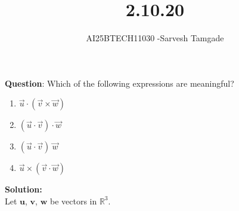 \documentclass[journal]{IEEEtran}
\begin{document}

\vspace{3cm}

\title{2.10.20}
\author{AI25BTECH11030 -Sarvesh Tamgade}
{\let\newpage\relax\maketitle}

\renewcommand{\thefigure}{\theenumi}
\renewcommand{\thetable}{\theenumi}
\setlength{\intextsep}{10pt} 


\renewcommand{\thetable}{\theenumi}


\textbf{Question}:  Which of the following expressions are meaningful?
\begin{multicols}{2}
\begin{enumerate}[label=(\alph*)]
     
\item $\vec{u} \cdot (\vec{v} \times \vec{w})$
\item $(\vec{u} \cdot \vec{v}) \cdot \vec{w}$
\item $(\vec{u} \cdot \vec{v})\ \vec{w}$
\item $\vec{u} \times (\vec{v} \cdot \vec{w})$

\end{enumerate}
\end{multicols}

\textbf{Solution:}\\
Let $\mathbf{u}$, $\mathbf{v}$, $\mathbf{w}$ be vectors in $\mathbb{R}^3$.
\end{document}
